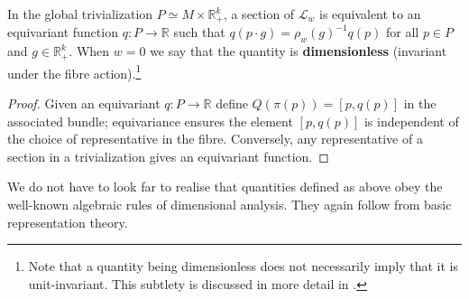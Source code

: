 \documentclass[12pt]{article}
\numberwithin{equation}{section}
\newcommand{\R}{\mathbb{R}}
\newtheorem{lemma}[theorem]{Lemma}
\begin{document}
In the global trivialization $P\simeq M\times \R_+^k$, a section of $\mathcal{L}_w$ is equivalent to an equivariant function $q \colon P\to \R$ such that $q(p\cdot g) = \rho_w(g)^{-1}q(p)$ for all $p\in P$ and $g\in \R_+^k$. When $w=0$ we say that the quantity is \textbf{dimensionless} (invariant under the fibre action).\footnote{Note that a quantity being dimensionless does not necessarily imply that it is unit-invariant. This subtlety is discussed in more detail in .}


\begin{proof}
    Given an equivariant $q\colon P\to \R$ define $Q(\pi(p)) = [p,q(p)]$ in the associated bundle; equivariance ensures the element $[p,q(p)]$ is independent of the choice of representative in the fibre. Conversely, any representative of a section in a trivialization gives an equivariant function.
\end{proof}

We do not have to look far to realise that quantities defined as above obey the well-known algebraic rules of dimensional analysis. They again follow from basic representation theory.
\end{document}
